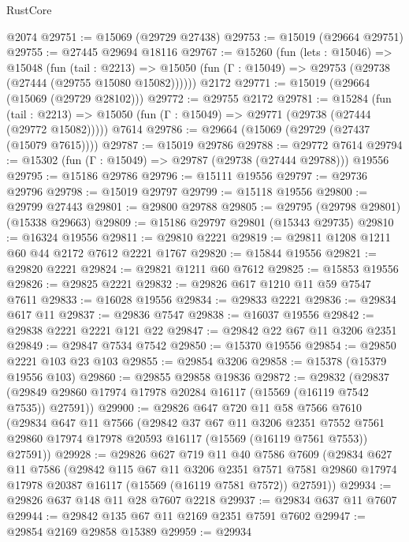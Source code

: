 \begin{lexlean}{RustCore}
\begin{coremodule}
    @2074
@29751 := @15069 (@29729 @27438)
@29753 := @15019 (@29664 @29751)
@29755 := @27445 @29694 @18116
@29767 := @15260
    (fun (lets : @15046) =>
    @15048
      (fun (tail : @2213) =>
      @15050 (fun (Γ : @15049) => @29753 (@29738 (@27444 (@29755 @15080 @15082))))))
    @2172
@29771 := @15019 (@29664 (@15069 (@29729 @28102)))
@29772 := @29755 @2172
@29781 := @15284
    (fun (tail : @2213) => @15050 (fun (Γ : @15049) => @29771 (@29738 (@27444 (@29772 @15082)))))
    @7614
@29786 := @29664 (@15069 (@29729 (@27437 (@15079 @7615))))
@29787 := @15019 @29786
@29788 := @29772 @7614
@29794 := @15302 (fun (Γ : @15049) => @29787 (@29738 (@27444 @29788))) @19556
@29795 := @15186 @29786
@29796 := @15111 @19556
@29797 := @29736 @29796
@29798 := @15019 @29797
@29799 := @15118 @19556
@29800 := @29799 @27443
@29801 := @29800 @29788
@29805 := @29795 (@29798 @29801) (@15338 @29663)
@29809 := @15186 @29797 @29801 (@15343 @29735)
@29810 := @16324 @19556
@29811 := @29810 @2221
@29819 := @29811 @1208 @1211 @60 @44 @2172 @7612 @2221 @1767
@29820 := @15844 @19556
@29821 := @29820 @2221
@29824 := @29821 @1211 @60 @7612
@29825 := @15853 @19556
@29826 := @29825 @2221
@29832 := @29826 @617 @1210 @11 @59 @7547 @7611
@29833 := @16028 @19556
@29834 := @29833 @2221
@29836 := @29834 @617 @11
@29837 := @29836 @7547
@29838 := @16037 @19556
@29842 := @29838 @2221 @2221 @121 @22
@29847 := @29842 @22 @67 @11 @3206 @2351
@29849 := @29847 @7534 @7542
@29850 := @15370 @19556
@29854 := @29850 @2221 @103 @23 @103
@29855 := @29854 @3206
@29858 := @15378 (@15379 @19556 @103)
@29860 := @29855 @29858 @19836
@29872 := @29832
    (@29837 (@29849 @29860 @17974 @17978 @20284 @16117 (@15569 (@16119 @7542 @7535)) @27591))
@29900 := @29826
    @647
    @720
    @11
    @58
    @7566
    @7610
    (@29834
      @647
      @11
      @7566
      (@29842
        @37
        @67
        @11
        @3206
        @2351
        @7552
        @7561
        @29860
        @17974
        @17978
        @20593
        @16117
        (@15569 (@16119 @7561 @7553))
        @27591))
@29928 := @29826
    @627
    @719
    @11
    @40
    @7586
    @7609
    (@29834
      @627
      @11
      @7586
      (@29842
        @115
        @67
        @11
        @3206
        @2351
        @7571
        @7581
        @29860
        @17974
        @17978
        @20387
        @16117
        (@15569 (@16119 @7581 @7572))
        @27591))
@29934 := @29826 @637 @148 @11 @28 @7607 @2218
@29937 := @29834 @637 @11 @7607
@29944 := @29842 @135 @67 @11 @2169 @2351 @7591 @7602
@29947 := @29854 @2169 @29858 @15389
@29959 := @29934

\end{coremodule}
\end{lexlean}
